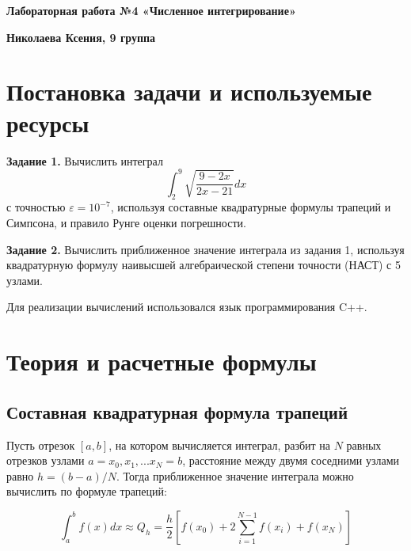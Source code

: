\documentclass[12pt,a4paper]{article}
\begin{document}
\begin{titlepage}
    \begin{center}
        \vspace*{\fill}
        
        \textbf{\LARGE Лабораторная работа №4
«Численное интегрирование»}
        
        \vspace{0.5cm}
        
        \textbf{\Large  Николаева Ксения, 9 группа}
        \vfill
        
    \end{center}
\end{titlepage}

\tableofcontents
\newpage

\section{Постановка задачи и используемые ресурсы}

\textbf{Задание 1.} Вычислить интеграл 
\begin{equation}
\int_{2}^{9} \sqrt{\frac{9-2x}{2x-21}} dx
\end{equation}
с точностью $\varepsilon = 10^{-7}$, используя составные квадратурные формулы трапеций и Симпсона, и правило Рунге оценки погрешности.

\textbf{Задание 2.} Вычислить приближенное значение интеграла из задания 1, используя квадратурную формулу наивысшей алгебраической степени точности (НАСТ) с 5 узлами.

Для реализации вычислений использовался язык программирования C++.

\section{Теория и расчетные формулы}

\subsection{Составная квадратурная формула трапеций}

Пусть отрезок $[a,b]$, на котором вычисляется интеграл, разбит на $N$ равных отрезков узлами $a = x_0, x_1, ... x_N = b$, расстояние между двумя соседними узлами равно $h = (b - a)/N$. Тогда приближенное значение интеграла можно вычислить по формуле трапеций:

\begin{equation}
\int_{a}^{b} f(x) dx \approx Q_h = \frac{h}{2} \left[ f(x_0) + 2\sum_{i=1}^{N-1} f(x_i) + f(x_N) \right]
\end{equation}
\end{document}
